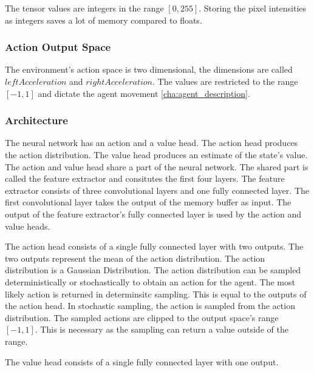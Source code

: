 The tensor values are integers in the range $[0,255]$. Storing the pixel intensities as integers saves a lot of memory compared to floats.


\subsubsection{Action Output Space}

The environment's action space is two dimensional, the dimensions are called $leftAcceleration$ and $rightAcceleration$. The values are restricted to the range $[-1,1]$ and dictate the agent movement \ref*{cha:agent_description}.

\subsubsection{Architecture}

The neural network has an action and a value head. The action head produces the action distribution. The value head produces an estimate of the state's value. The action and value head share a part of the neural network. The shared part is called the feature extractor and consitutes the first four layers. The feature extractor consists of three convolutional layers and one fully connected layer. The first convolutional layer takes the output of the memory buffer as input. The output of the feature extractor's fully connected layer is used by the action and value heads.

The action head consists of a single fully connected layer with two outputs. The two outputs represent the mean of the action distribution. The action distribution is a Gaussian Distribution. The action distribution can be sampled deterministically or stochastically to obtain an action for the agent. The most likely action is returned in determinsitc sampling. This is equal to the outputs of the action head. In stochastic sampling, the action is sampled from the action distribution.
The sampled actions are clipped to the output space's range $[-1,1]$. This is necessary as the sampling can return a value outside of the range.

The value head consists of a single fully connected layer with one output.

